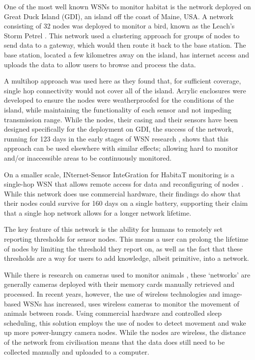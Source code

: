 	One of the most well known WSNs to monitor habitat is the network deployed on Great Duck Island (GDI), an island off the coast of Maine, USA. A network consisting of 32 nodes was deployed to monitor a bird, known as the Leach’s Storm Petrel \cite{Mainwaring2002}. This network used a clustering approach for groups of nodes to send data to a gateway, which would then route it back to the base station. The base station, located a few kilometres away on the island, has internet access and uploads the data to allow users to browse and process the data.

	A multihop approach was used here as they found that, for sufficient coverage, single hop connectivity would not cover all of the island. Acrylic enclosures were developed to ensure the nodes were weatherproofed for the conditions of the island, while maintaining the functionality of each sensor and not impeding transmission range. While the nodes, their casing and their sensors have been designed specifically for the deployment on GDI, the success of the network, running for 123 days in the early stages of WSN research \cite{Szewczyk2004c}, shows that this approach can be used elsewhere with similar effects; allowing hard to monitor and/or inaccessible areas to be continuously monitored.

	On a smaller scale, INternet-Sensor InteGration for HabitaT monitoring is a single-hop WSN that allows remote access for data and reconfiguring of nodes \cite{Demirbas}. While this network does use commercial hardware, their findings do show that their nodes could survive for 160 days on a single battery, supporting their claim that a single hop network allows for a longer network lifetime. 
	
	The key feature of this network is the ability for humans to remotely set reporting thresholds for sensor nodes. This means a user can prolong the lifetime of nodes by limiting the threshold they report on, as well as the fact that these thresholds are a way for users to add knowledge, albeit primitive, into a network.

	While there is research on cameras used to monitor animals \cite{Kays2009, Ahumada2011a}, these ‘networks’ are generally cameras deployed with their memory cards manually retrieved and processed. In recent years, however, the use of wireless technologies and image-based WSNs has increased, \cite{Garcia-Sanchez2010b} uses wireless cameras to monitor the movement of animals between roads. Using commercial hardware and controlled sleep scheduling, this solution employs the use of nodes to detect movement and wake up more power-hungry camera nodes. While the nodes are wireless, the distance of the network from civilisation means that the data does still need to be collected manually and uploaded to a computer.

